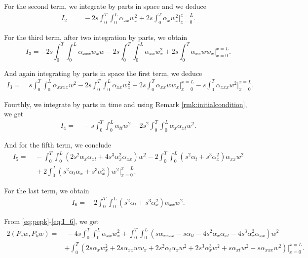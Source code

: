 \documentclass[10pt]{article}
\def\\Phivec{\mathbf{\Phi}}
\newcommand{\ii}{\iiTL }
\newcommand{\iiTL}{\int_0^T\!\!\!\!\int_0^L }
\begin{document}
\begin{appendix}
	For the second term, we integrate by parts in space and we deduce
\begin{equation}\label{eq:I_2}
\begin{alignedat}{2}
	I_2
	=&~-2s\ii \alpha_{xx}w_x^2 +2s\int_0^T \alpha_xw_x^2\bigg|_{x=0}^{x=L}.
\end{alignedat}
\end{equation}

	For the third term,  after two integration by parts, we obtain
\[
	I_3=- 2s \ii \alpha_{xxx}w_xw  -2s \ii \alpha_{xx}  w_x^2+2s\int_0^T \alpha_{xx} w  w_x\bigg|_{x=0}^{x=L}.
\]

	And again integrating by parts in space the first term, we deduce
\begin{equation}\label{eq:I_3}
\begin{alignedat}{2}
	I_3=&~ s \ii \alpha_{xxxx}w^2  -2s \ii \alpha_{xx}  w_x^2
	 +2s\int_0^T \alpha_{xx} w  w_x\bigg|_{x=0}^{x=L} -s\int_0^T \alpha_{xxx}w^2\bigg|_{x=0}^{x=L}.
\end{alignedat}
\end{equation}
	
	Fourthly, we integrate by parts in time and using Remark  \ref{rmk:initialcondition}, we get
\begin{equation}\label{eq:I_4}
\begin{alignedat}{2}
	I_4=&~  -s\ii \alpha_{tt} w^2-2s^2\ii \alpha_x\alpha_{xt} w^2.
\end{alignedat}
\end{equation}		
	
		And for the fifth term, we conclude
\begin{equation}\label{eq:I_5}
\begin{alignedat}{2}
	I_5=&~ -\ii \left(2s^2\alpha_x\alpha_{xt}+4s^3\alpha_x^2\alpha_{xx}\right)w^2-
	      2\ii (s^2\alpha_t+s^3\alpha_x^2)\alpha_{xx} w^2\\
	      &~+2\int_0^T (s^2\alpha_t\alpha_x+s^3\alpha_x^3)  w^2\bigg|_{x=0}^{x=L}  .
\end{alignedat}
\end{equation}

	For the last term, we obtain	
\begin{equation}\label{eq:I_6}
\begin{alignedat}{2}
	I_6=&~ 2\ii (s^2\alpha_t+s^3\alpha_x^2) \alpha_{xx} w^2.
\end{alignedat}
\end{equation}

From \eqref{eq:pepk}-\eqref{eq:I_6}, we  get
\begin{align*}
	2(P_ew,P_kw) =&~-4s\ii \alpha_{xx}w_x^2+ \ii \left(s\alpha_{xxxx}-s\alpha_{tt}-4s^2\alpha_x\alpha_{xt}
	-4s^3\alpha_x^2\alpha_{xx} \right)w^2\\
	&+\int_0^T\left(2s\alpha_x w_x^2 +2s \alpha_{xx} ww_x+2s^2\alpha_t\alpha_xw^2+2s^3\alpha_x^3w^2+s\alpha_{xt}w^2
	- s\alpha_{xxx}w^2 \right)\bigg|_{x=0}^{x=L}.
\end{align*}
	

\end{appendix}
\end{document}
